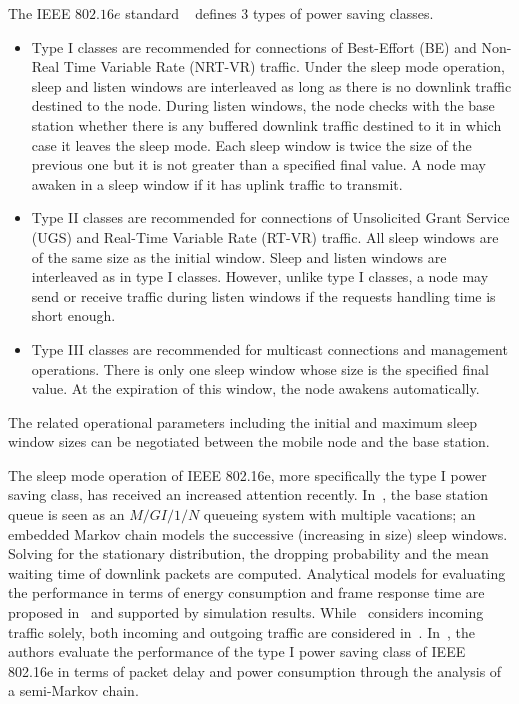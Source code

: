 \documentclass[journal]{IEEEtran}
\begin{document}
The IEEE $802.16e$ standard ~\cite{man} defines 3 types of power saving classes.
\begin{itemize}
\item
Type I classes are recommended for connections of Best-Effort (BE) and Non-Real Time Variable Rate (NRT-VR) traffic. Under the sleep mode operation, sleep and listen windows are interleaved as long as
there is no downlink traffic destined to the node. During listen windows, the node checks with the base station whether there is any buffered downlink traffic destined to it in which case it leaves the sleep mode. Each sleep window is twice the size of the previous one but it is not greater than a specified final value. A node may awaken in a sleep window if it has uplink traffic to transmit.
\item
Type II classes are recommended for connections of Unsolicited Grant Service (UGS) and Real-Time Variable Rate (RT-VR) traffic. All sleep windows are of the same size as the initial window. Sleep and listen windows are interleaved as in type I classes. However, unlike type I classes, a node may send or receive traffic during listen windows if the requests handling time is short enough.
\item
Type III classes are recommended for multicast connections and management operations. There is only one sleep window whose size is the specified final value. At the expiration of this window, the node awakens automatically. 
\end{itemize}
The related operational parameters including the initial and maximum sleep window sizes can be negotiated between the mobile node and the base station. 

The sleep mode operation of IEEE 802.16e, more specifically the type I power saving class, has received an increased attention recently. In~\cite{vtc04}, the base station queue is seen as an $M/GI/1/N$ queueing system with multiple vacations; an embedded Markov chain models the successive (increasing in size) sleep windows. Solving for the stationary distribution, the dropping probability and the mean waiting time of downlink packets are computed. Analytical models for evaluating the performance in terms of energy consumption and frame response time are proposed in~\cite{Xiao05,Xiao06} and supported by simulation results. While~\cite{Xiao05} considers incoming traffic solely, both incoming and outgoing traffic are considered in~\cite{Xiao06}. In~\cite{vtc06}, the authors evaluate the performance of the type I power saving class of IEEE 802.16e in terms of packet delay and power consumption through the analysis of a semi-Markov chain. 
\end{document}
